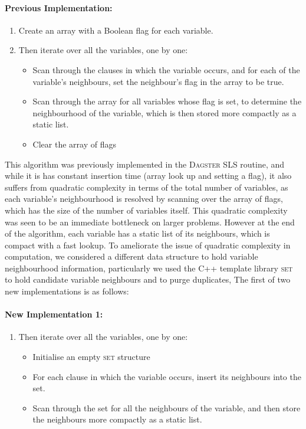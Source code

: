 \documentclass[10pt,a4paper,oneside,headinclude,footinclude,BCOR5mm]{scrartcl}
\newcommand{\dagster}{\textsc{Dagster}\xspace}
\begin{document}
\pagebreak
\paragraph{Previous Implementation:}
\begin{enumerate}
\item Create an array with a Boolean flag for each variable.
\item Then iterate over all the variables, one by one:
\begin{itemize} 
\item Scan through the clauses in which the variable occurs, and for each of the variable's neighbours, set the neighbour's flag in the array to be true.
\item Scan through the array for all variables whose flag is set, to determine the neighbourhood of the variable, which is then stored more compactly as a static list.
\item Clear the array of flags
\end{itemize}
\end{enumerate}

This algorithm was previously implemented in the \dagster SLS routine, and while it is has constant insertion time (array look up and setting a flag), it also suffers from quadratic complexity in terms of the total number of variables, as each variable's neighbourhood is resolved by scanning over the array of flags, which has the size of the number of variables itself.
This quadratic complexity was seen to be an immediate bottleneck on larger problems.
However at the end of the algorithm, each variable has a static list of its neighbours, which is compact with a fast lookup.
To ameliorate the issue of quadratic complexity in computation, we considered a different data structure to hold variable neighbourhood information, particularly we used the \textsc{C++} template library \textsc{set} to hold candidate variable neighbours and to purge duplicates, The first of two new implementations is as follows:

\paragraph{New Implementation 1:}
\begin{enumerate}
\item Then iterate over all the variables, one by one:
\begin{itemize} 
\item Initialise an empty \textsc{set} structure
\item For each clause in which the variable occurs, insert its neighbours into the set.
\item Scan through the set for all the neighbours of the variable, and then store the neighbours more compactly as a static list.
\end{itemize}
\end{enumerate}
\end{document}

